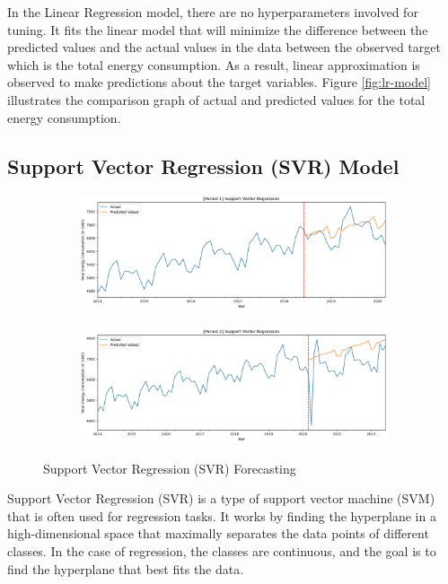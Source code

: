 \documentclass[runningheads]{llncs}
\begin{document}
In the Linear Regression model, there are no hyperparameters involved for tuning. It fits the linear model that will minimize the difference between the predicted values and the actual values in the data between the observed target which is the total energy consumption. As a result, linear approximation is observed to make predictions about the target variables. Figure \ref{fig:lr-model} illustrates the comparison graph of actual and predicted values for the total energy consumption. 

\subsection{Support Vector Regression (SVR) Model}
\begin{figure}
    \begin{subfigure}[b]{\textwidth}
         \centering
         \includegraphics[width=\textwidth]{svr/p1-SVR.png}
         \caption{}
         \label{fig:modelSVR-p1}
    \end{subfigure}
    \begin{subfigure}[b]{\textwidth}
         \centering
         \includegraphics[width=\textwidth]{svr/p2-SVR.png}
         \caption{}
         \label{fig:modelSVR-p2}
    \end{subfigure}
    \caption{Support Vector Regression (SVR) Forecasting}
    \label{fig:svr-model}
\end{figure}
Support Vector Regression (SVR) is a type of support vector machine (SVM) that is often used for regression tasks. It works by finding the hyperplane in a high-dimensional space that maximally separates the data points of different classes. In the case of regression, the classes are continuous, and the goal is to find the hyperplane that best fits the data.
\end{document}
